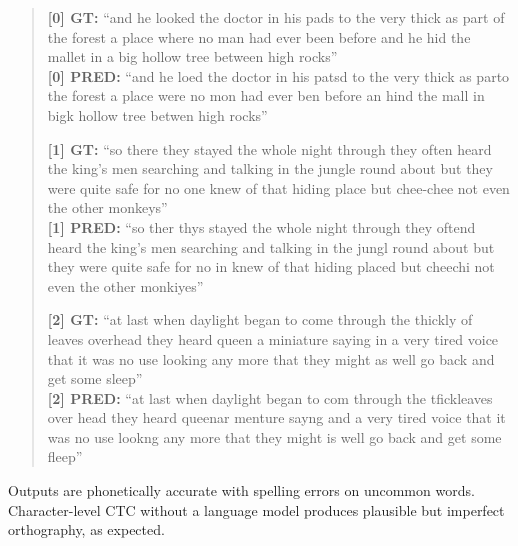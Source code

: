 \documentclass[11pt,a4paper]{article}
\begin{document}
\begin{quote}
\small
\textbf{[0] GT:} ``and he looked the doctor in his pads to the very thick as
part of the forest a place where no man had ever been before and he hid the
mallet in a big hollow tree between high rocks'' \\
\textbf{[0] PRED:} ``and he loed the doctor in his patsd to the very thick as
parto the forest a place were no mon had ever ben before an hind the mall in
bigk hollow tree betwen high rocks''

\medskip

\textbf{[1] GT:} ``so there they stayed the whole night through they often
heard the king's men searching and talking in the jungle round about but they
were quite safe for no one knew of that hiding place but chee-chee not even the
other monkeys'' \\
\textbf{[1] PRED:} ``so ther thys stayed the whole night through they oftend
heard the king's men searching and talking in the jungl round about but they
were quite safe for no in knew of that hiding placed but cheechi not even the
other monkiyes''

\medskip

\textbf{[2] GT:} ``at last when daylight began to come through the thickly of
leaves overhead they heard queen a miniature saying in a very tired voice that
it was no use looking any more that they might as well go back and get some
sleep'' \\
\textbf{[2] PRED:} ``at last when daylight began to com through the tfickleaves
over head they heard queenar menture sayng and a very tired voice that it was no
use lookng any more that they might is well go back and get some fleep''
\end{quote}

Outputs are phonetically accurate with spelling errors on uncommon words.
Character-level CTC without a language model produces plausible but imperfect
orthography, as expected.
\end{document}
